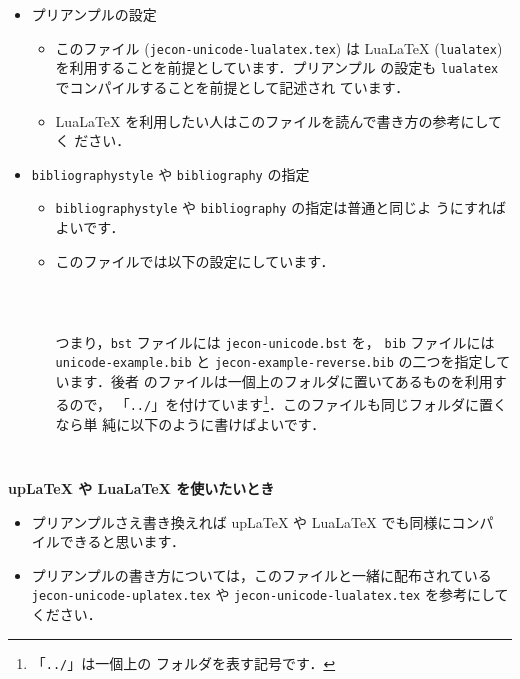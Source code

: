 \documentclass[article]{jlreq}
\begin{document}
\begin{itemize}
 \item プリアンプルの設定
       \begin{itemize}
        \item このファイル (\texttt{jecon-unicode-lualatex.tex}) は LuaLaTeX
              (\texttt{lualatex}) を利用することを前提としています．プリアンプル
              の設定も \texttt{lualatex} でコンパイルすることを前提として記述され
              ています．
        \item LuaLaTeX を利用したい人はこのファイルを読んで書き方の参考にしてく
              ださい．
       \end{itemize}
 \item \texttt{bibliographystyle} や \texttt{bibliography} の指定
       \begin{itemize}
        \item \texttt{bibliographystyle} や \texttt{bibliography} の指定は普通と同じよ
       うにすればよいです．
        \item このファイルでは以下の設定にしています．
\begin{verbatim}
               
                
\end{verbatim}
       つまり，\texttt{bst} ファイルには \texttt{jecon-unicode.bst} を，
              \texttt{bib} ファイルには \texttt{unicode-example.bib} と
              \texttt{jecon-example-reverse.bib} の二つを指定しています．後者
              のファイルは一個上のフォルダに置いてあるものを利用するので，
              「\texttt{../}」を付けています\footnote{「\texttt{../}」は一個上の
              フォルダを表す記号です．}．このファイルも同じフォルダに置くなら単
              純に以下のように書けばよいです．
\begin{verbatim}
                
\end{verbatim}
       \end{itemize}
\end{itemize}

\vspace*{1em}

\textbf{upLaTeX や LuaLaTeX を使いたいとき}
\begin{itemize}
        \item プリアンプルさえ書き換えれば upLaTeX や LuaLaTeX でも同様にコンパ
              イルできると思います．
        \item プリアンプルの書き方については，このファイルと一緒に配布されている
              \texttt{jecon-unicode-uplatex.tex} や
              \texttt{jecon-unicode-lualatex.tex} を参考にしてください．
\end{itemize}
\end{document}
